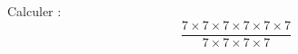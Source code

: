 
\begin{mental}
    
    Calculer :
    \begin{equation}
        \frac{ 7\times 7\times 7\times 7\times 7\times 7 }{ 7\times 7\times 7\times 7 }
    \end{equation}

\end{mental}
